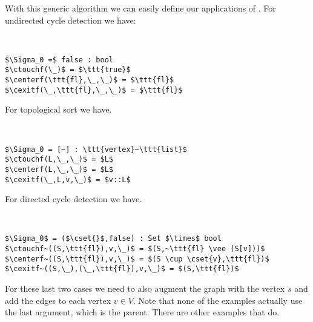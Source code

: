 With this generic algorithm we can easily define our applications of
\dfs{}.  For undirected cycle detection we have:

\begin{algorithm}
~\\
\begin{lstlisting}[numbers=none]
$\Sigma_0 =$ false : bool
$\ctouchf(\_)$ = $\ttt{true}$
$\centerf(\ttt{fl},\_,\_)$ = $\ttt{fl}$
$\cexitf(\_,\ttt{fl},\_,\_)$ = $\ttt{fl}$
\end{lstlisting}
\end{algorithm}


For topological sort we have.

\begin{algorithm}
~\\
\begin{lstlisting}[numbers=none]
$\Sigma_0 = [~] : \ttt{vertex}~\ttt{list}$
$\ctouchf(L,\_,\_)$ = $L$
$\centerf(L,\_,\_)$ = $L$
$\cexitf(\_,L,v,\_)$ = $v::L$
\end{lstlisting}
\end{algorithm}


For directed cycle detection we have.

\begin{algorithm}
~\\
\begin{lstlisting}[numbers=none]
$\Sigma_0$ = ($\cset{}$,false) : Set $\times$ bool
$\ctouchf~((S,\ttt{fl}),v,\_)$ = $(S,~\ttt{fl} \vee (S[v]))$
$\centerf~((S,\ttt{fl}),v,\_)$ = $(S \cup \cset{v},\ttt{fl})$
$\cexitf~((S,\_),(\_,\ttt{fl}),v,\_)$ = $(S,\ttt{fl})$
\end{lstlisting}
\end{algorithm}

For these last two cases we need to also augment the graph with the
vertex $s$ and add the edges to each vertex $v \in V$.  Note that
none of the examples actually use the last argument, which is the
parent.  There are other examples that do.


